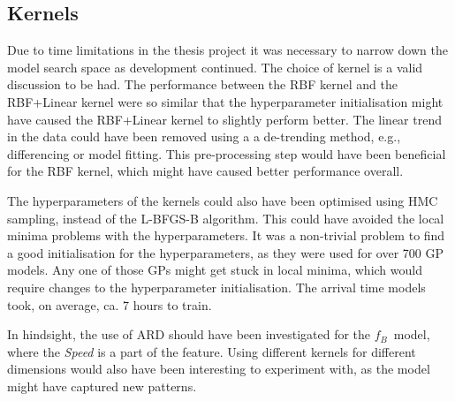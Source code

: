 \subsection{Kernels}
Due to time limitations in the thesis project it was necessary to narrow down the model search space as development continued.
The choice of kernel is a valid discussion to be had.
The performance between the RBF kernel and the RBF+Linear kernel were so similar that the hyperparameter initialisation might have caused the RBF+Linear kernel to slightly perform better.
The linear trend in the data could have been removed using a a de-trending method, e.g., differencing or model fitting.
This pre-processing step would have been beneficial for the RBF kernel, which might have caused better performance overall.

The hyperparameters of the kernels could also have been optimised using HMC sampling, instead of the L-BFGS-B algorithm.
This could have avoided the local minima problems with the hyperparameters. 
It was a non-trivial problem to find a good initialisation for the hyperparameters, as they were used for over 700 GP models.
Any one of those GPs might get stuck in local minima, which would require changes to the hyperparameter initialisation.
The arrival time models took, on average, ca. 7 hours to train. 

In hindsight, the use of ARD should have been investigated for the $f_B$ model, where the \textit{Speed} is a part of the feature.
Using different kernels for different dimensions would also have been interesting to experiment with, as the model might have captured new patterns.

